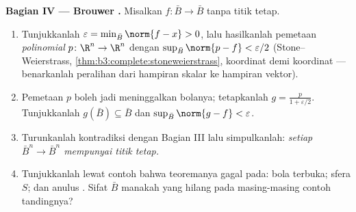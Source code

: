 \begin{problem}
\medskip
\noindent\textbf{Bagian IV --- Brouwer .} Misalkan
$f\colon\bar B\to\bar B$  tanpa titik tetap.
\begin{enumerate}[resume]
  \item Tunjukkanlah $\varepsilon = \min_{\bar B}\norm{f - x} > 0$,
        lalu hasilkanlah pemetaan \emph{polinomial} $p\colon\R^n\to
        \R^n$ dengan $\sup_{\bar B}\norm{p - f} <
        \varepsilon/2$ (Stone--Weierstrass,
        \cref{thm:b3:complete:stoneweierstrass}, koordinat
        demi koordinat --- benarkanlah peralihan dari hampiran
        skalar ke hampiran vektor).
  \item Pemetaan $p$ boleh jadi meninggalkan bolanya; tetapkanlah $g = \frac{p}{1
        + \varepsilon/2}$. Tunjukkanlah $g(\bar B) \subseteq \bar B$
        dan $\sup_{\bar B}\norm{g - f} < \varepsilon$.
  \item Turunkanlah kontradiksi dengan Bagian III lalu simpulkanlah:
        \emph{setiap  $\bar B^n \to \bar B^n$
        mempunyai titik tetap.}
  \item Tunjukkanlah lewat contoh bahwa teoremanya gagal pada: bola
        terbuka; sfera $S$; dan anulus . Sifat
        $\bar B$ manakah yang hilang pada masing-masing contoh tandingnya?
\end{enumerate}


\end{problem}
